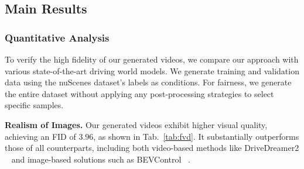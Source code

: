  
\subsection{Main Results}

\subsubsection{Quantitative Analysis}
To verify the high fidelity of our generated videos, we compare our approach with various state-of-the-art driving world models. 
We generate training and validation data using the nuScenes dataset’s labels as conditions. 
For fairness, we generate the entire dataset without applying any post-processing strategies to select specific samples. 


\noindent\textbf{Realism of Images.} 
Our generated videos exhibit higher visual quality, achieving an FID of $3.96$, as shown in Tab.~\ref{tab:fvd}. It substantially outperforms those of all counterparts, including both video-based methods like DriveDreamer2 ~\cite{drivedreamer2} and image-based solutions such as BEVControl ~\cite{bevcontrol}. %



\begin{table}[tb]
    \centering
    \footnotesize
    \caption{Comparison on multi-object tracking task with MagicDrive-V2 \cite{gao2024magicdrivedithighresolutionlongvideo} based on a pre-trained StreamPETR model.
    }
    \label{tab:tracking}
\end{table}



